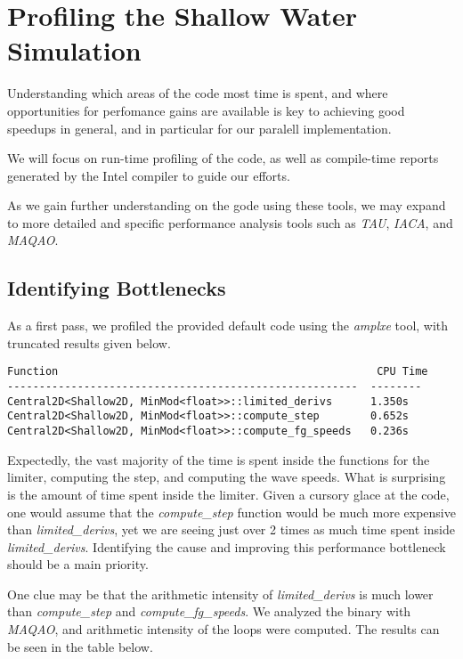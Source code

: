 \section{Profiling the Shallow Water Simulation}
\label{sec-profile}

Understanding which areas of the code most time is spent, and where opportunities for 
perfomance gains are available is key to achieving good speedups in general, and
in particular for our paralell implementation.

We will focus on run-time profiling of the code, as well as compile-time reports generated
by the Intel compiler to guide our efforts.

As we gain further understanding on the gode using these tools, we may expand to more detailed
and specific performance analysis tools such as \emph{TAU}, \emph{IACA}, and \emph{MAQAO}.

\subsection{Identifying Bottlenecks}
\label{sec-profile-bottlenecks}
As a first pass, we profiled the provided default code using the \emph{amplxe} tool, with 
truncated results given below.

\begin{lstlisting}
Function                                                  CPU Time
-------------------------------------------------------  -------- 
Central2D<Shallow2D, MinMod<float>>::limited_derivs      1.350s
Central2D<Shallow2D, MinMod<float>>::compute_step        0.652s
Central2D<Shallow2D, MinMod<float>>::compute_fg_speeds   0.236s 
\end{lstlisting}

Expectedly, the vast majority of the time is spent inside the functions for the limiter,
computing the step, and computing the wave speeds.  What is surprising is the amount of 
time spent inside the limiter.  Given a cursory glace at the code, one would assume that
the \emph{compute\_step} function would be much more expensive than \emph{limited\_derivs}, 
yet we are seeing just over 2 times as much time spent inside \emph{limited\_derivs}.
Identifying the cause and improving this performance bottleneck should be a main priority.

One clue may be that the arithmetic intensity of \emph{limited\_derivs} is much lower than
\emph{compute\_step} and \emph{compute\_fg\_speeds}.  We analyzed the binary with \emph{MAQAO},
and arithmetic intensity of the loops were computed.  The results can be seen in the table below.

